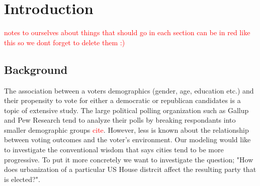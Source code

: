 \documentclass[12pt]{article}
\newcommand{\red}[1]{\textcolor{red}{#1}}
\begin{document}











\thispagestyle{empty} %
\newpage

\tableofcontents
\newpage


\section{Introduction}


\textcolor{red}{notes to ourselves about things that should go in each section can be in red like this so we dont forget to delete them :)}


\subsection*{Background}
The association between a voters demographics (gender, age, education etc.) and their propensity to vote for either a democratic or republican candidates is a topic of extensive study. The large political polling organization such as Gallup and Pew Research tend to analyze their polls by breaking respondants into smaller demographic groups \red{cite}. However, less is known about the relationship between voting outcomes and the voter's environment. Our modeling would like to investigate the conventional wisdom that says cities tend to be more progressive. To put it more concretely we want to investigate the question; "How does urbanization of a particular US House distrcit affect the resulting party that is elected?". 
\end{document}
